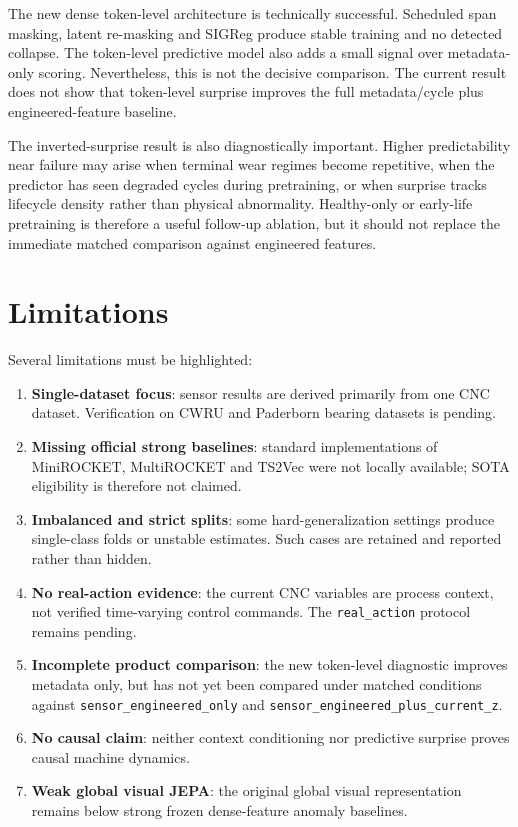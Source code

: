\documentclass[10pt,journal,compsoc]{IEEEtran}
\begin{document}
The new dense token-level architecture is technically successful. Scheduled span masking, latent re-masking and SIGReg produce stable training and no detected collapse. The token-level predictive model also adds a small signal over metadata-only scoring. Nevertheless, this is not the decisive comparison. The current result does not show that token-level surprise improves the full metadata/cycle plus engineered-feature baseline.

The inverted-surprise result is also diagnostically important. Higher predictability near failure may arise when terminal wear regimes become repetitive, when the predictor has seen degraded cycles during pretraining, or when surprise tracks lifecycle density rather than physical abnormality. Healthy-only or early-life pretraining is therefore a useful follow-up ablation, but it should not replace the immediate matched comparison against engineered features.

\section{Limitations}
Several limitations must be highlighted:
\begin{enumerate}
    \item \textbf{Single-dataset focus}: sensor results are derived primarily from one CNC dataset. Verification on CWRU and Paderborn bearing datasets is pending.
    \item \textbf{Missing official strong baselines}: standard implementations of MiniROCKET, MultiROCKET and TS2Vec were not locally available; SOTA eligibility is therefore not claimed.
    \item \textbf{Imbalanced and strict splits}: some hard-generalization settings produce single-class folds or unstable estimates. Such cases are retained and reported rather than hidden.
    \item \textbf{No real-action evidence}: the current CNC variables are process context, not verified time-varying control commands. The \texttt{real\_action} protocol remains pending.
    \item \textbf{Incomplete product comparison}: the new token-level diagnostic improves metadata only, but has not yet been compared under matched conditions against \texttt{sensor\_engineered\_only} and \texttt{sensor\_engineered\_plus\_current\_z}.
    \item \textbf{No causal claim}: neither context conditioning nor predictive surprise proves causal machine dynamics.
    \item \textbf{Weak global visual JEPA}: the original global visual representation remains below strong frozen dense-feature anomaly baselines.
\end{enumerate}
\end{document}
